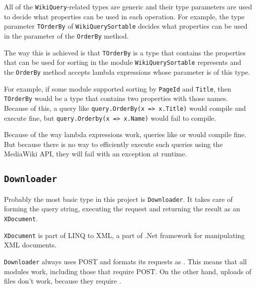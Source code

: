 \medskip
\pagebreak[0]


All of the \lstinline{WikiQuery}-related types are generic
and their type parameters are used to decide what properties can be used in each operation.
For example, the type parameter \lstinline{TOrderBy} of \lstinline{WikiQuerySortable}
decides what properties can be used in the parameter of the \lstinline{OrderBy} method.

The way this is achieved is that \lstinline{TOrderBy} is a type that contains the properties that can be
used for sorting in the module \lstinline{WikiQuerySortable} represents
and the \lstinline{OrderBy} method accepts lambda expressions whose parameter is of this type.

For example, if some module supported sorting by \lstinline{PageId} and \lstinline{Title},
then \lstinline{TOrderBy} would be a type that contains two properties with those names.
Because of this, a query like \lstinline{query.OrderBy(x => x.Title)} would compile and execute fine,
but \lstinline{query.Orderby(x => x.Name)} would fail to compile.

Because of the way lambda expressions work, queries like  or  would compile fine.
But because there is no way to efficiently execute such queries using the MediaWiki API,
they will fail with an exception at runtime.

\medskip




\subsection{\lstinline{Downloader}}

Probably the most basic type in this project is \lstinline{Downloader}.
It takes care of forming the query string, executing the request and
returning the result as an \lstinline{XDocument}.

\lstinline{XDocument} is part of LINQ to XML, a part of .Net framework for manipulating XML documents.

\lstinline{Downloader} always uses POST and formats its requests as .
This means that all modules work, including those that require POST.
On the other hand, uploads of files don't work, because they require .

